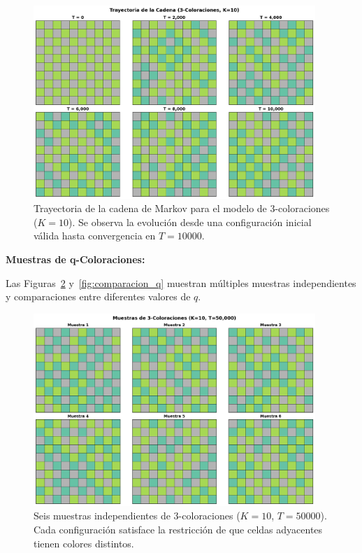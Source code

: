 \begin{figure}[htbp]
\centering
\includegraphics[width=0.95\textwidth]{img/figuras/trayectoria_q_coloraciones.png}
\caption{Trayectoria de la cadena de Markov para el modelo de 3-coloraciones ($K=10$). Se observa la evolución desde una configuración inicial válida hasta convergencia en $T=10000$.}
\label{fig:trayectoria_q}
\end{figure}

\textbf{Muestras de q-Coloraciones:}

Las Figuras~\ref{fig:multiples_q3} y~\ref{fig:comparacion_q} muestran múltiples muestras independientes y comparaciones entre diferentes valores de $q$.

\begin{figure}[htbp]
\centering
\includegraphics[width=0.95\textwidth]{img/figuras/multiples_muestras_q3.png}
\caption{Seis muestras independientes de 3-coloraciones ($K=10$, $T=50000$). Cada configuración satisface la restricción de que celdas adyacentes tienen colores distintos.}
\label{fig:multiples_q3}
\end{figure}

